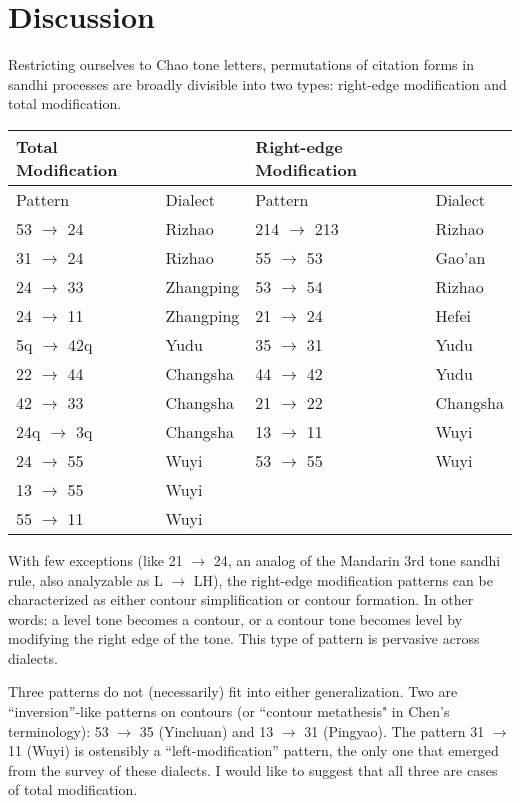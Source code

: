 \documentclass{article}
\begin{document}
\section{Discussion}
Restricting ourselves to Chao tone letters, permutations of citation forms in sandhi processes are broadly divisible into two types: right-edge modification and total modification.
\begin{exe}
\ex
\begin{tabular}[t]{ll|ll}
Total Modification & & Right-edge Modification & \\
\hline
\hline
Pattern & Dialect & Pattern & Dialect \\
\hline
53 $\rightarrow$ 24 & Rizhao & 214 $\rightarrow$ 213 & Rizhao \\
31 $\rightarrow$ 24 & Rizhao & 55 $\rightarrow$ 53 & Gao'an \\
24 $\rightarrow$ 33 & Zhangping & 53 $\rightarrow$ 54 & Rizhao \\
24 $\rightarrow$ 11 & Zhangping & 21 $\rightarrow$ 24 & Hefei \\
5q $\rightarrow$ 42q & Yudu & 35 $\rightarrow$ 31 & Yudu \\
22 $\rightarrow$ 44 & Changsha & 44 $\rightarrow$ 42 & Yudu \\
42 $\rightarrow$ 33 & Changsha & 21 $\rightarrow$ 22 & Changsha \\
24q $\rightarrow$ 3q & Changsha & 13 $\rightarrow$ 11 & Wuyi \\
24 $\rightarrow$ 55 & Wuyi & 53 $\rightarrow$ 55 & Wuyi \\
13 $\rightarrow$ 55 & Wuyi & & \\
55 $\rightarrow$ 11 & Wuyi & & \\
\end{tabular}
\end{exe}
With few exceptions (like 21 $\rightarrow$ 24, an analog of the Mandarin 3rd tone sandhi rule, also analyzable as L $\rightarrow$ LH), the right-edge modification patterns can be characterized as either contour simplification or contour formation. In other words: a level tone becomes a contour, or a contour tone becomes level by modifying the right edge of the tone. This type of pattern is pervasive across dialects. \par
Three patterns do not (necessarily) fit into either generalization. Two are ``inversion''-like patterns on contours (or ``contour metathesis" in Chen's terminology): 53 $\rightarrow$ 35 (Yinchuan) and 13 $\rightarrow$ 31 (Pingyao). The pattern 31 $\rightarrow$ 11 (Wuyi) is ostensibly a ``left-modification'' pattern, the only one that emerged from the survey of these dialects. I would like to suggest that all three are cases of total modification. \par
\end{document}
